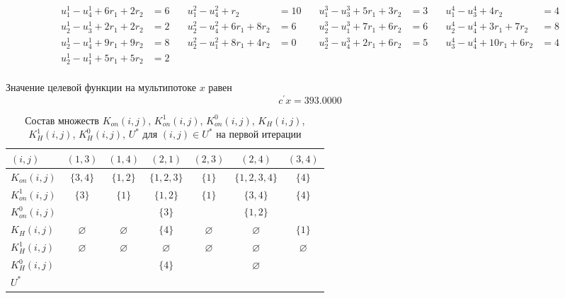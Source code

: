 \documentclass[a4paper,14pt,usenames,dvipsnames]{extreport}
\begin{document}
{\footnotesize
\begin{align*}
u_{1}^{1}-u_{4}^{1}+6 r_{1}+2 r_{2}&=6 \quad & u_{1}^{2}-u_{4}^{2}+ r_{2}&=10 \quad &u_{1}^{3}-u_{3}^{3}+5 r_{1}+3 r_{2}&=3 \quad & u_{1}^{4}-u_{3}^{4}+4 r_{2}&=4\\
u_{2}^{1}-u_{3}^{1}+2 r_{1}+2 r_{2}&=2 \quad  & u_{2}^{2}-u_{4}^{2}+6 r_{1}+8 r_{2}&=6 \quad  &u_{2}^{3}-u_{1}^{3}+7 r_{1}+6 r_{2}&=6 \quad & u_{2}^{4}-u_{4}^{4}+3 r_{1}+7 r_{2}&=8\\
u_{2}^{1}-u_{4}^{1}+9 r_{1}+9 r_{2}&=8 \quad & u_{2}^{2}-u_{1}^{2}+8 r_{1}+4 r_{2} & =0 \quad  & u_{2}^{3}-u_{4}^{3}+2 r_{1}+6 r_{2}&=5 \quad & u_{3}^{4}-u_{4}^{4}+10 r_{1}+6 r_{2}&=4\\
u_{2}^{1}-u_{1}^{1} + 5 r_{1}+ 5 r_{2}&=2\\
\end{align*}
}%

Значение целевой функции на мультипотоке $x$ равен
$$
c^{\prime} x =393.0000
$$

\begin{table}[H] 
\renewcommand{\arraystretch}{1.3}
\caption{Состав множеств $K_{on}(i, j)$, $K_{on}^{1}(i, j)$, $K_{on}^{0}(i, j)$, $K_{H}(i, j)$, $K_{H}^{1}(i, j)$, $K_{H}^{0}(i, j)$, $U^{*}$ для $(i, j) \in U^{*}$ на первой итерации} \label{tab:t11}
\begin{center}
\begin{tabular}{|l|c|c|c|c|c|c|}
\hline$(i, j)$ & $(1,3)$ & $(1,4)$ & $(2,1)$ & $(2,3)$ & $(2,4)$ & $(3,4)$\\
\hline$K_{o n}(i, j)$ & $\{3,4\}$  & $\{1,2\}$ & $\{1,2,3\}$ & $\{1\}$& $\{1,2,3,4\}$ & $\{4\}$\\
\hline$K_{o n}^{1}(i, j)$ & $\{3\}$  & $\{1\}$ & $\{1,2\}$ & $\{1\}$ & $\{3,4\}$ & $\{4\}$\\
\hline$K_{o n}^{0}(i, j)$ & & & $\{3\}$ & & $\{1,2\}$ & \\
\hline$K_{H}(i, j)$ & $\varnothing$ & $\varnothing$ & $\{4\}$ & $\varnothing$ & $\varnothing$ & $\{1\}$\\
\hline$K_{H}^{1}(i, j)$ & $\varnothing$ & $\varnothing$ & $\varnothing$ & $\varnothing$ & $\varnothing$ & $\varnothing$\\
\hline$K_{H}^{0}(i, j)$ & & & $\{4\}$ & & $\varnothing$ & \\
\hline$U^{*}$ & & & & & & \\
\hline
\end{tabular}
\end{center}
\end{table}
\end{document}
